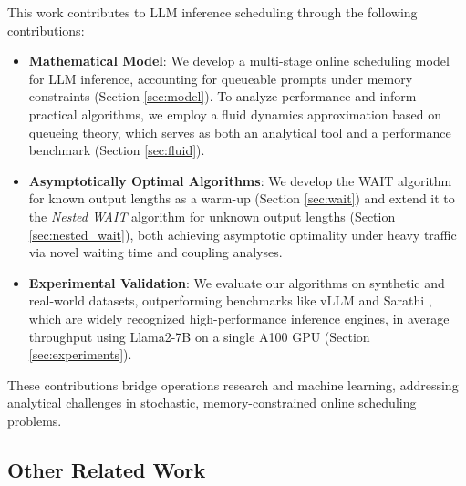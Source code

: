 This work contributes to LLM inference scheduling through the following contributions:
\begin{itemize}
\item \textbf{Mathematical Model}: We develop a multi-stage online scheduling model for LLM inference, accounting for queueable prompts under memory constraints (Section \ref{sec:model}). To analyze performance and inform practical algorithms, we employ a fluid dynamics approximation based on queueing theory, which serves as both an analytical tool and a performance benchmark (Section \ref{sec:fluid}).
    \item \textbf{Asymptotically Optimal Algorithms}: We develop the WAIT algorithm for known output lengths as a warm-up (Section \ref{sec:wait}) and extend it to the \textit{Nested WAIT} algorithm for unknown output lengths (Section \ref{sec:nested_wait}), both achieving asymptotic optimality under heavy traffic via novel waiting time and coupling analyses.
    \item \textbf{Experimental Validation}: We evaluate our algorithms on synthetic and real-world datasets, outperforming benchmarks like vLLM \citep{kwon2023efficient} and Sarathi \citep{agrawal2023sarathi}, which are widely recognized high-performance inference engines, in average throughput using Llama2-7B on a single A100 GPU (Section \ref{sec:experiments}).
\end{itemize}
These contributions bridge operations research and machine learning, addressing analytical challenges in stochastic, memory-constrained online scheduling problems.

\subsection{Other Related Work}


